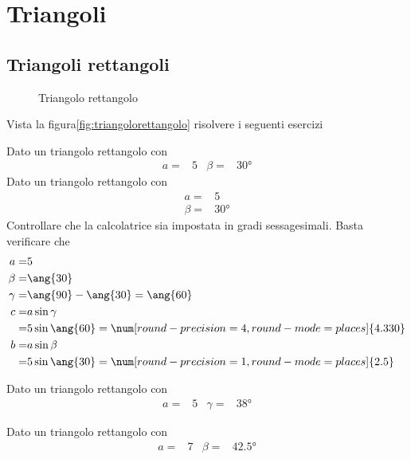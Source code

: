 \tcbstartrecording
\chapter{Triangoli}
\label{cha:trigonometriatriangoli}
 \section{Triangoli rettangoli}
 \begin{figure}
	\centering
	
	\caption{Triangolo rettangolo}
	\label{fig:triangolorettangolo}
\end{figure}

Vista la figura\nobs\vref{fig:triangolorettangolo} risolvere i seguenti esercizi
 \tcbstartrecording
 \begin{exercise}
 	Dato un triangolo rettangolo con
 	\begin{align*}
 	a=&5
 &	\beta=&\ang{30}
 	\end{align*}
\tcblower
	Dato un triangolo rettangolo con
\begin{align*}
a=&5\\
\beta=&\ang{30}
\end{align*}
Controllare che la calcolatrice sia impostata in gradi sessagesimali.
Basta verificare che \testgradi 
\begin{align*}
a=&5\\
\beta=&\ang{30}\\
\gamma=&\ang{90}-\ang{30}=\ang{60}\\
c=&a\sin\gamma\\
=& 5\sin\ang{60}=\num[round-precision=\lungarrotandamento,round-mode=places]{4.330}\\
b=&a\sin\beta\\
=& 5\sin\ang{30}=\num[round-precision=1,round-mode=places]{2.5}
\end{align*}
 \end{exercise}
 \begin{exercise}[no solution]
 	 	Dato un triangolo rettangolo con
 	\begin{align*}
 	a=&5&
 	\gamma=&\ang{38}
 	\end{align*}
 \end{exercise}
\begin{exercise}[no solution]
	Dato un triangolo rettangolo con
	\begin{align*}
	a=&7&
	\beta=&\ang{42.5}
	\end{align*}
\end{exercise}
